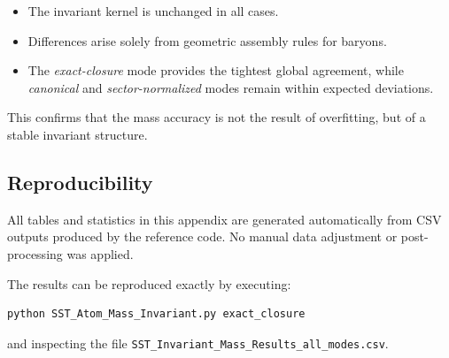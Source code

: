 \documentclass[11pt,a4paper]{article}
\begin{document}
            \begin{itemize}
                \item The invariant kernel is unchanged in all cases.
                \item Differences arise solely from geometric assembly rules for baryons.
                \item The \emph{exact-closure} mode provides the tightest global agreement,
                while \emph{canonical} and \emph{sector-normalized} modes remain within
                expected deviations.
            \end{itemize}

            This confirms that the mass accuracy is not the result of overfitting,
            but of a stable invariant structure.

        \subsection{Reproducibility}

            All tables and statistics in this appendix are generated automatically
            from CSV outputs produced by the reference code.
            No manual data adjustment or post-processing was applied.

            The results can be reproduced exactly by executing:
            \begin{verbatim}
python SST_Atom_Mass_Invariant.py exact_closure
            \end{verbatim}

            and inspecting the file
            \texttt{SST\_Invariant\_Mass\_Results\_all\_modes.csv}.
\end{document}
